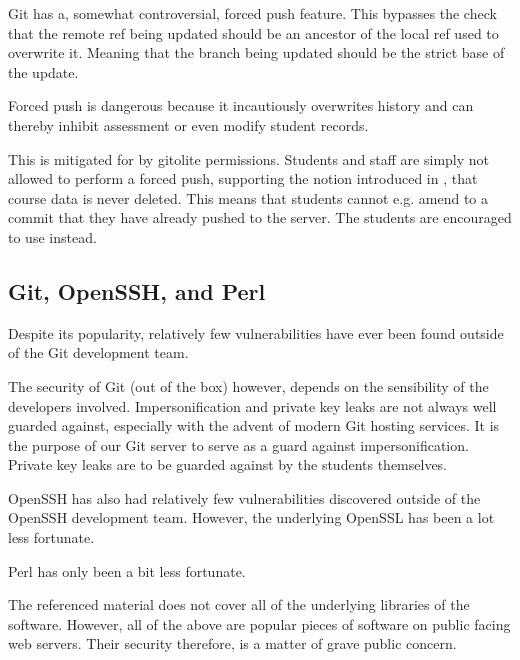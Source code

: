 Git has a, somewhat controversial\cite{torvalds-2007,hamano-2009,rego-2013},
forced push feature. This bypasses the check that the remote ref being updated
should be an ancestor of the local ref used to overwrite
it\cite{man-1-git-push}. Meaning that the branch being updated should be the
strict base of the update.

Forced push is dangerous because it incautiously overwrites history and can
thereby inhibit assessment or even modify student records.

This is mitigated for by gitolite permissions. Students and staff are simply
not allowed to perform a forced push, supporting the notion introduced in
, that course data is never deleted.
This means that students cannot e.g. amend to a commit that they have already
pushed to the server. The students are encouraged to use
\cite{man-1-git-revert} instead.

\subsection{Git, OpenSSH, and Perl}

Despite its popularity, relatively few vulnerabilities have ever been found
outside of the Git development team\cite{cvedetails-com-2014a}.

The security of Git (out of the box) however, depends on the sensibility of the
developers involved. Impersonification and private key leaks are not always
well guarded against\cite{gerwitz-2013}, especially with the advent of modern
Git hosting services\cite{homakov-2012,huang-2013,homakov-2014}. It is the
purpose of our Git server to serve as a guard against impersonification.
Private key leaks are to be guarded against by the students themselves. 

OpenSSH has also had relatively few vulnerabilities discovered outside of the
OpenSSH development team\cite{cvedetails-com-2014b}. However, the underlying
OpenSSL has been a lot less fortunate\cite{cvedetails-com-2014c}.

Perl has only been a bit less fortunate\cite{cvedetails-com-2014d}.

The referenced material does not cover all of the underlying libraries of the
software. However, all of the above are popular pieces of software on public
facing web servers.  Their security therefore, is a matter of grave public
concern.
